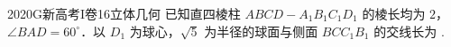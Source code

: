 
\begin{problem}{2020}{G}{新高考I卷}{16}{立体几何}
已知直四棱柱 $ ABCD-A_1B_1C_1D_1 $ 的棱长均为 $ 2 $，$ \angle BAD=60^\circ $．以 $ D_1 $ 为球心，$ \sqrt{5} $ 为半径的球面与侧面 $ BCC_1B_1 $ 的交线长为 \underline{\hspace{4em}}.
\end{problem}

\begin{answer}

\end{answer}

\begin{solutions}

\end{solutions}
